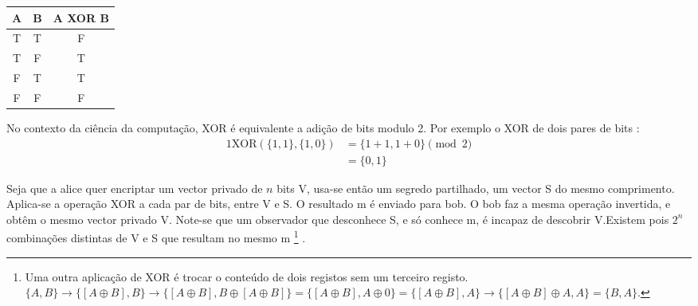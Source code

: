 \begin{enumerate}
\begin{center}
    \begin{tabular}{|c|c|c|}
    \hline
        A & B & A XOR B \\
    \hline\hline
        T & T & F \\
    \hline
        T & F & T \\
    \hline
        F & T & T \\
    \hline
        F & F & F \\
    \hline
    \end{tabular}
\end{center}

No contexto da ciência da computação, XOR é equivalente a adição de bits modulo 2. Por exemplo o XOR de dois pares de bits :
\begin{alignat*}{1}
    \text{XOR}(\{1,1\},\{1,0\}) &= \{1+1,1+0\} \pmod 2 \\
                                &= \{0,1\} 
\end{alignat*}


Seja que a alice quer encriptar um vector privado de $n$ bits V, usa-se então um segredo partilhado, um vector S do mesmo comprimento. Aplica-se a operação XOR a cada par de bits, entre V e S. O resultado m é enviado para bob. O bob faz a mesma operação invertida, e obtêm o mesmo vector privado V. Note-se que um observador que desconhece S, e só conhece m, é incapaz de descobrir V.\newline Existem pois $2^n$ combinações distintas de V e S que resultam no mesmo m \footnote{Uma outra aplicação de XOR é trocar o conteúdo de dois registos sem um terceiro registo. $\{A, B\} \rightarrow{} \{[A \oplus B], B\} \rightarrow{} \{[A \oplus B], B \oplus [A \oplus B]\} = \{[A \oplus B], A \oplus 0\} = \{[A \oplus B], A\} \rightarrow{} \{[A \oplus B] \oplus A, A\} = \{B, A\}$.} .


\end{enumerate}
